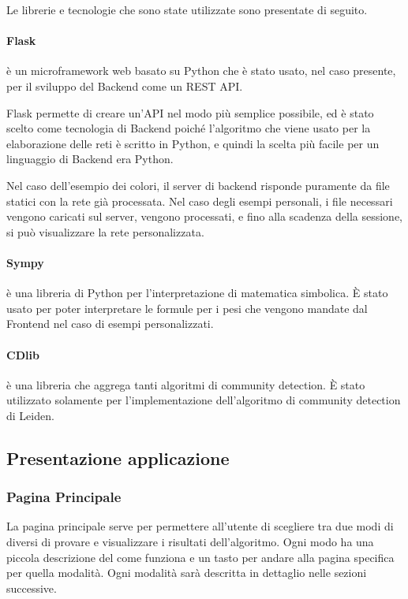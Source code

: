 \documentclass[a4paper,12pt]{report}
\begin{document}
			Le librerie e tecnologie che sono state utilizzate sono presentate di seguito.
			
			\paragraph*{Flask} è un microframework web basato su Python che è stato usato, nel caso presente, per il sviluppo del Backend come un REST API. \cite{flaskforeword}

				Flask permette di creare un’API nel modo più semplice possibile, ed è stato scelto come tecnologia di Backend poiché l'algoritmo che viene usato per la elaborazione delle reti è scritto in Python, e quindi la scelta più facile per un linguaggio di Backend era Python. 

				Nel caso dell'esempio dei colori, il server di backend risponde puramente da file statici con la rete già processata. Nel caso degli esempi personali, i file necessari vengono caricati sul server, vengono processati, e fino alla scadenza della sessione, si può visualizzare la rete personalizzata.

			\paragraph*{Sympy} è una libreria di Python per l'interpretazione di matematica simbolica. È stato usato per poter interpretare le formule per i pesi che vengono mandate dal Frontend nel caso di esempi personalizzati. \cite{sympy}

			\paragraph*{CDlib} è una libreria che aggrega tanti algoritmi di community detection. È stato utilizzato solamente per l'implementazione dell'algoritmo di community detection di Leiden. \cite{cdlib}
			
		\subsection{Presentazione applicazione}
			
			\subsubsection{Pagina Principale}
			La pagina principale serve per permettere all'utente di scegliere tra due modi di diversi di provare e visualizzare i risultati dell'algoritmo. Ogni modo ha una piccola descrizione del come funziona e un tasto per andare alla pagina specifica per quella modalità. Ogni modalità sarà descritta in dettaglio nelle sezioni successive.
\end{document}
